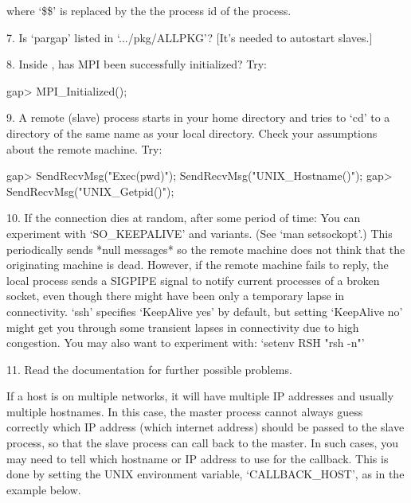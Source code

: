 \item{}
    where `\$\$' is replaced by the  the  process  id  of  the  {\ParGAP}
    process.

\item{7.}
    Is `pargap' listed in `.../pkg/ALLPKG'?
    [It's needed to autostart slaves.]

\item{8.}
    Inside {\ParGAP}, has MPI been successfully initialized?
    Try:  
    
\beginexample
gap> MPI_Initialized();
\endexample

\item{9.}
    A remote (slave) {\ParGAP} process starts in your home directory  and
    tries to `cd'  to  a  directory  of  the  same  name  as  your  local
    directory. Check your assumptions about the remote machine. Try:

\beginexample
gap> SendRecvMsg("Exec(pwd)"); SendRecvMsg("UNIX_Hostname()");
gap> SendRecvMsg("UNIX_Getpid()");
\endexample

\item{10.}
    If the connection dies at random, after some period of time:
    You can experiment with `SO_KEEPALIVE' and variants.  
    (See `man setsockopt'.)
    This periodically sends *null messages* so the  remote  machine  does
    not think that the originating  machine  is  dead.  However,  if  the
    remote machine fails to reply, the  local  process  sends  a  SIGPIPE
    signal to notify current processes of a broken  socket,  even  though
    there might have been only a temporary lapse in connectivity.
    `ssh' specifies `KeepAlive yes' by default, but setting `KeepAlive no'
    might get you through some transient lapses in  connectivity  due  to
    high congestion. 
    You may also want to experiment with: `setenv RSH "rsh -n"'

\item{11.}
    Read the documentation for further possible problems.

\endlist


If a host is on multiple networks, it will have multiple IP addresses and
usually multiple hostnames. In  this  case,  the  master  process  cannot
always guess correctly which IP address (which internet  address)  should
be passed to the slave process, so that the slave process can  call  back
to the master. In such cases,  you  may  need  to  tell  {\ParGAP}  which
hostname or IP address to use for the callback. This is done  by  setting
the UNIX environment variable, `CALLBACK_HOST', as in the example below.

